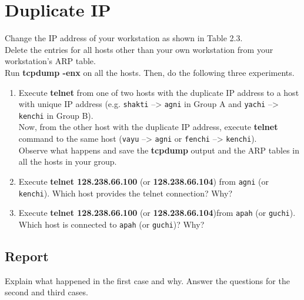\documentclass{../UTNetLab}
\begin{document}
\section{Duplicate IP}
    Change the IP address of your workstation as shown in Table 2.3. \\
    Delete the entries for all hosts other than your own workstation from your workstation’s ARP table. \\
    Run \textbf{tcpdump -enx} on all the hosts.
    Then, do the following three experiments. \\
    \begin{enumerate}
        \item Execute \textbf{telnet} from one of two hosts with the duplicate IP address to a host with unique IP address (e.g. \texttt{shakti} –> \texttt{agni} in Group A and \texttt{yachi} –> \texttt{kenchi} in Group B). \\
        Now, from the other host with the duplicate IP address, execute \textbf{telnet} command to the same host (\texttt{vayu} –> \texttt{agni} or \texttt{fenchi} –> \texttt{kenchi}). \\
        Observe what happens and save the \textbf{tcpdump} output and the ARP tables in all the hosts in your group.
        \item Execute \textbf{telnet 128.238.66.100} (or \textbf{128.238.66.104}) from \texttt{agni} (or \texttt{kenchi}).
        Which host provides the telnet connection?
        Why?
        \item Execute \textbf{telnet 128.238.66.100} (or \textbf{128.238.66.104})from \texttt{apah} (or \texttt{guchi}). Which host is connected to \texttt{apah} (or \texttt{guchi})? Why?
    \end{enumerate}
    \subsection*{Report}
    Explain what happened in the first case and why.
    Answer the questions for the second and third cases.
\end{document}
